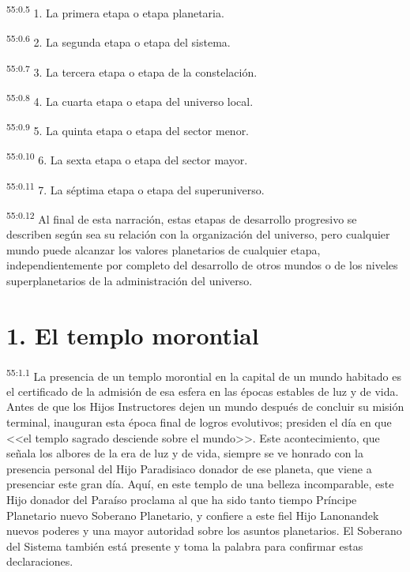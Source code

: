\par
\textsuperscript{55:0.5} 1. La primera etapa o etapa planetaria.

\par
\textsuperscript{55:0.6} 2. La segunda etapa o etapa del sistema.

\par
\textsuperscript{55:0.7} 3. La tercera etapa o etapa de la constelación.

\par
\textsuperscript{55:0.8} 4. La cuarta etapa o etapa del universo local.

\par
\textsuperscript{55:0.9} 5. La quinta etapa o etapa del sector menor.

\par
\textsuperscript{55:0.10} 6. La sexta etapa o etapa del sector mayor.

\par
\textsuperscript{55:0.11} 7. La séptima etapa o etapa del superuniverso.

\par
\textsuperscript{55:0.12} Al final de esta narración, estas etapas de desarrollo progresivo se describen según sea su relación con la organización del universo, pero cualquier mundo puede alcanzar los valores planetarios de cualquier etapa, independientemente por completo del desarrollo de otros mundos o de los niveles superplanetarios de la administración del universo.

\section*{1. El templo morontial}
\par
\textsuperscript{55:1.1} La presencia de un templo morontial en la capital de un mundo habitado es el certificado de la admisión de esa esfera en las épocas estables de luz y de vida. Antes de que los Hijos Instructores dejen un mundo después de concluir su misión terminal, inauguran esta época final de logros evolutivos; presiden el día en que <<el templo sagrado desciende sobre el mundo>>. Este acontecimiento, que señala los albores de la era de luz y de vida, siempre se ve honrado con la presencia personal del Hijo Paradisiaco donador de ese planeta, que viene a presenciar este gran día. Aquí, en este templo de una belleza incomparable, este Hijo donador del Paraíso proclama al que ha sido tanto tiempo Príncipe Planetario nuevo Soberano Planetario, y confiere a este fiel Hijo Lanonandek nuevos poderes y una mayor autoridad sobre los asuntos planetarios. El Soberano del Sistema también está presente y toma la palabra para confirmar estas declaraciones.

